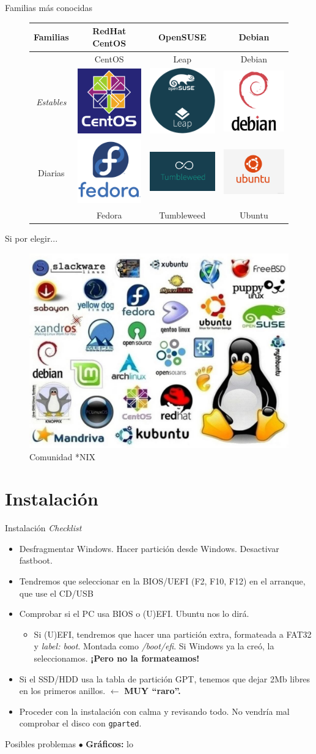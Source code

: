 \documentclass[12pt]{beamer}
\begin{document}
\begin{frame}{Familias más conocidas}
\vspace*{-2em}
\begin{figure}
	\begin{tabular}{cccc}
		Familias & RedHat \newline CentOS & OpenSUSE & Debian \\ \hline
		& CentOS & Leap & Debian \\
		\textit{Estables} &\includegraphics[scale=0.3]{centos_logo_blue} & \includegraphics[scale=0.16]{leap-500-500x500} & \includegraphics[scale=0.07]{Debian-Logo-Vector}\\
		Diarias & \includegraphics[scale=0.01]{fedora-logo} & \includegraphics[scale=0.6]{opensuse-tumbleweed-logo} & \includegraphics[scale=0.07]{logo-ubuntu} \\ 
		& Fedora & Tumbleweed & Ubuntu
	\end{tabular}
\end{figure}
\end{frame}

\begin{frame}{Si por elegir...}
	\begin{figure}
		\centering
		\includegraphics[width=0.77\linewidth]{distros-1024x768}
		\caption{Comunidad *NIX}
\end{figure}
	
\end{frame}

\section{Instalación}
\begin{frame}{Instalación}
	\textit{Checklist}
	\begin{itemize}
		\item Desfragmentar Windows. Hacer partición desde Windows. Desactivar fastboot.
		\item Tendremos que seleccionar en la BIOS/UEFI (F2, F10, F12) en el arranque, que use el CD/USB
		\item Comprobar si el PC usa BIOS o (U)EFI. Ubuntu nos lo dirá.
		\begin{itemize}
			\item Si (U)EFI, tendremos que hacer una partición extra, formateada a FAT32 y \textit{label: boot}. Montada como \textit{/boot/efi}. Si Windows ya la creó, la seleccionamos. \textbf{¡Pero no la formateamos!}
		\end{itemize}
		\item Si el SSD/HDD usa la tabla de partición GPT, tenemos que dejar 2Mb libres en los primeros anillos. $\leftarrow$ \textbf{MUY ``raro''.}
		\item Proceder con la instalación con calma y revisando todo. No vendría mal comprobar el disco con \texttt{gparted}.
	\end{itemize}
\end{frame}

\begin{frame}{Posibles problemas}
	$\bullet$ \textbf{Gráficos:} lo
\end{frame}
\end{document}
